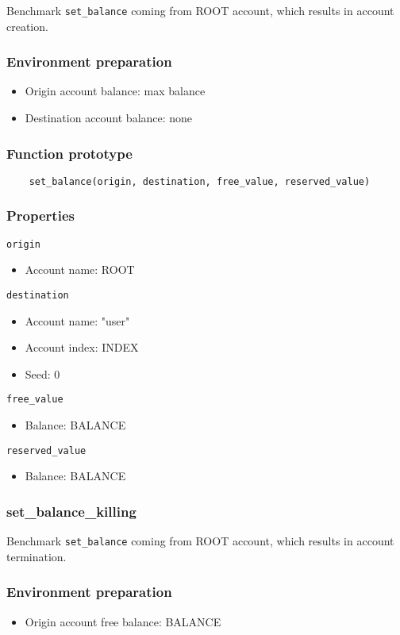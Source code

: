 \documentclass[11pt,a4paper]{article}
\begin{document}
Benchmark \verb|set_balance| coming from ROOT account, which results in account creation.

\subsubsection*{Environment preparation}
\begin{itemize}
\item Origin account balance: max balance
\item Destination account balance: none
\end{itemize}

\subsubsection*{Function prototype}
\begin{verbatim}
    set_balance(origin, destination, free_value, reserved_value)
\end{verbatim}

\subsubsection*{Properties}
\verb|origin|
\begin{itemize}
\item Account name: ROOT
\end{itemize}
\verb|destination|
\begin{itemize}
\item Account name: "user"
\item Account index: INDEX
\item Seed: 0
\end{itemize}
\verb|free_value|
\begin{itemize}
\item Balance: BALANCE
\end{itemize}
\verb|reserved_value|
\begin{itemize}
\item Balance: BALANCE
\end{itemize}

\subsubsection{set\_balance\_killing}

Benchmark \verb|set_balance| coming from ROOT account, which results in account termination.

\subsubsection*{Environment preparation}
\begin{itemize}
    \item Origin account free balance: BALANCE
\end{itemize}
\end{document}
